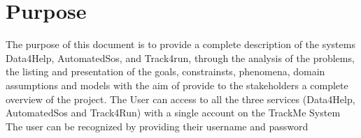 \section{Purpose}
The purpose of this document is to provide a complete description of the systems Data4Help, AutomatedSos, and Track4run, through the analysis of the problems, the listing and presentation of the goals, constrainsts, phenomena, domain assumptions and models with the aim of provide to the stakeholders a complete overview of the project.
\newline \newline
[G1] The User can access to all the three services (Data4Help, AutomatedSos and Track4Run) with a single account on the TrackMe System \newline \newline
 [G2]The user can be recognized by providing their username and password \newline

